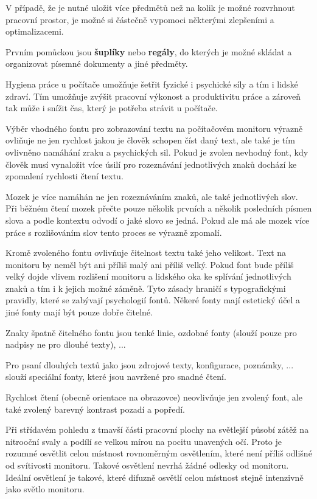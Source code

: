 V případě, že je nutné uložit více předmětů než na kolik je možné rozvrhnout pracovní prostor, je možné si částečně vypomoci některými zlepšeními a optimalizacemi. 

Prvním pomůckou jsou {\bf šuplíky} nebo {\bf regály}, do kterých je možné skládat a organizovat písemné dokumenty a jiné předměty. 



Hygiena práce u počítače umožňuje šetřit fyzické i psychické síly a tím i lidské zdraví. Tím umožňuje zvýšit pracovní výkonost a produktivitu práce a zároveň tak může i snížit čas, který je potřeba strávit u počítače.



Výběr vhodného fontu pro zobrazování textu na počítačovém monitoru výrazně ovliňuje ne jen rychlost jakou je člověk schopen číst daný text, ale také je tím ovlivněno namáhání zraku a psychických sil. Pokud je zvolen nevhodný font, kdy člověk musí vynaložit více úsilí pro rozeznávání jednotlivých znaků dochází ke zpomalení rychlosti čtení textu. 

Mozek je více namáhán ne jen rozeznáváním znaků, ale také jednotlivých slov. Při běžném čtení mozek přečte pouze několik prvních a několik posledních písmen slova a podle kontextu odvodí o jaké slovo se jedná. Pokud ale má ale mozek více práce s rozlišováním slov tento proces se výrazně zpomalí.

Kromě zvoleného fontu ovlivňuje čitelnost textu také jeho velikost. Text na monitoru by neměl být ani příliš malý ani příliš velký. Pokud font bude příliš velký dojde vlivem rozlišení monitoru a lidského oka ke splívání jednotlivých znaků a tím i k jejich možné záměně. Tyto zásady hraničí s typografickými pravidly, které se zabývají psychologií fontů. Někeré fonty  mají estetický účel a jiné fonty mají být pouze dobře čitelné.

Znaky špatně čitelného fontu jsou tenké linie, ozdobné fonty (slouží pouze pro nadpisy ne pro dlouhé texty), ...

Pro psaní dlouhých textů jako jsou zdrojové texty, konfigurace, poznámky, ... slouží speciální fonty, které jsou navržené pro snadné čtení.



Rychlost čtení (obecně orientace na obrazovce) neovlivňuje jen zvolený font, ale také zvolený barevný kontrast pozadí a popředí.

Při střídavém pohledu z tmavší části pracovní plochy na světlejší působí zátěž na nitrooční svaly a podílí se velkou mírou na pocitu unavených očí. Proto je rozumné osvětlit celou místnost rovnoměrným osvětlením, které není příliš odlišné od svítivosti monitoru. Takové osvětlení nevrhá žádné odlesky od monitoru. Ideální osvětlení je takové, které difuzně osvětlí celou místnost stejně intenzivně jako světlo monitoru.

